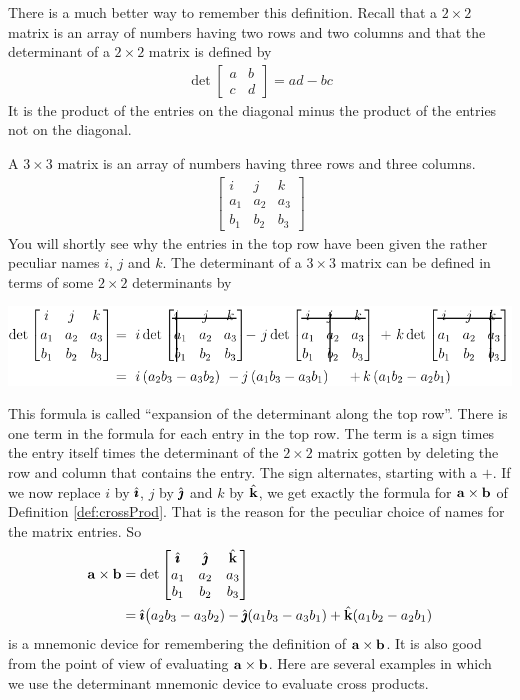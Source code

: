 There is a much better way to remember this definition. Recall that
a $2\times 2$ matrix is an array of numbers having two rows and two columns
and that the determinant of a $2\times 2$ matrix is  defined by
\begin{align*}
\det \left[\begin{matrix}a& b\\ c&d\end{matrix}\right]=ad-bc
\end{align*}
It is the product of the entries on the diagonal minus the product
of the entries not on the diagonal. 

A $3\times 3$ matrix is an array of
numbers having three rows and three columns.
\begin{align*}
 \left[\begin{matrix}i& j &k\\ a_1&a_2&a_3\\ b_1&b_2&b_3\end{matrix}\right]
\end{align*}
You will shortly see why the entries in the top row have been given the
rather peculiar names $i$, $j$ and $k$. The determinant of a $3\times 3$ 
matrix can be defined in terms of some $2\times 2$ determinants by
      \begin{center}
      \includegraphics{det.pdf}
      \end{center}
This formula is called ``expansion of the determinant along the top row''. 
There is one term in the formula for each entry in the top row. The term is
a sign times the entry itself times the determinant of the $2\times 2$ matrix
gotten by deleting the row and column that contains the entry. The sign
alternates, starting with a $+$. If we now replace $i$ by $\hat{\pmb{\imath}}$, $j$ by $\hat{\pmb{\jmath}}$ 
and $k$ by $\hat{\mathbf{k}}$, we get exactly the formula for $\mathbf{a}\times \mathbf{b}$
of Definition \ref{def:crossProd}. That is the reason for the peculiar 
choice of names for the matrix entries. So
\begin{align*}
\mathbf{a}\times\mathbf{b}
&=\det\left[\begin{matrix}\hat{\pmb{\imath}}& \hat{\pmb{\jmath}} &\hat{\mathbf{k}}\\ 
                            a_1&a_2&a_3\\ 
                            b_1&b_2&b_3\end{matrix}\right] \\
&=\hat{\pmb{\imath}}\big(a_2b_3-a_3b_2) -\hat{\pmb{\jmath}}(a_1b_3-a_3b_1) +\hat{\mathbf{k}}(a_1b_2-a_2b_1)
\end{align*}
is a mnemonic device for remembering the definition of $\mathbf{a}\times\mathbf{b}$.
It is also good from the point of view of evaluating $\mathbf{a}\times\mathbf{b}$.
Here are several examples in which we use the determinant mnemonic device to 
evaluate cross products.

